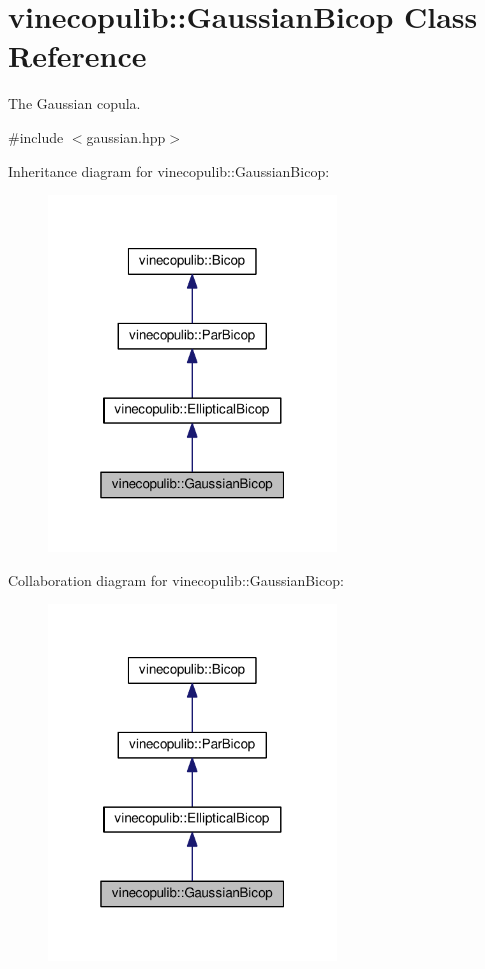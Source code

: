 \hypertarget{classvinecopulib_1_1_gaussian_bicop}{}\section{vinecopulib\+:\+:Gaussian\+Bicop Class Reference}
\label{classvinecopulib_1_1_gaussian_bicop}


The Gaussian copula.  




{\ttfamily \#include $<$gaussian.\+hpp$>$}



Inheritance diagram for vinecopulib\+:\+:Gaussian\+Bicop\+:\nopagebreak
\begin{figure}[H]
\begin{center}
\leavevmode
\includegraphics[width=217pt]{classvinecopulib_1_1_gaussian_bicop__inherit__graph}
\end{center}
\end{figure}


Collaboration diagram for vinecopulib\+:\+:Gaussian\+Bicop\+:\nopagebreak
\begin{figure}[H]
\begin{center}
\leavevmode
\includegraphics[width=217pt]{classvinecopulib_1_1_gaussian_bicop__coll__graph}
\end{center}
\end{figure}
